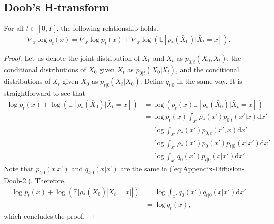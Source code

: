 

\subsection{Doob's H-transform}
\begin{lem}\label{lem:H-transform}
    For all $t\in [0,T]$, the following relationship holds.
    \begin{align}
    \nabla_x \log q_{t}(x) = \nabla_x \log p_{t}(x) + \nabla_x \log (\mathbb{E}[\rho_*(\bar{X}_0)|\bar{X}_{t}=x]).
    \label{eq:Appendix-Diffusion-Doob-1}
    \end{align}
\end{lem}
\begin{proof}
    Let us denote the joint distribution of $\bar{X}_0$ and $\bar{X}_t$ as $p_{0,t}(\bar{X}_0,\bar{X}_t)$, the conditional distributions of $\bar{X}_0$ given $\bar{X}_t$ as $p_{0|t}(\bar{X}_0|\bar{X}_t)$, and the conditional distributions of $\bar{X}_t$ given $\bar{X}_0$ as $p_{t|0}(\bar{X}_t|\bar{X}_0)$. Define $q_{t|0}$ in the same way. 
    It is straightforward to see that %
    \begin{align}
        \log p_{t}(x) + \log (\mathbb{E}[\rho_*(\bar{X}_0)|\bar{X}_{t}=x])
        &= \log (p_{t}(x)\mathbb{E}[\rho_*(\bar{X}_0)|\bar{X}_{t}=x])
        \\ & = \log p_{t}(x)\int_{x'} \rho_*(x')p_{0|t}(x'|x)\mathrm{d}x'
        \\ & = \log \int_{x'} \rho_*(x')p_{0,t}(x',x)\mathrm{d}x'
        \\ & = \log \int_{x'} \rho_*(x')p_0(x')p_{t|0}(x|x')\mathrm{d}x'
        \\ & = \log \int_{x'} q_0(x')p_{t|0}(x|x')\mathrm{d}x'.
        \label{eq:Appendix-Diffusion-Doob-2}
    \end{align}
    Note that $p_{t|0}(x|x')$ and $q_{t|0}(x|x')$ are the same in (\ref{eq:Appendix-Diffusion-Doob-2}). Therefore,
    \begin{align}
        \log p_{t}(x) + \log (\mathbb{E}[\rho_*(\bar{X}_0)|\bar{X}_{t}=x]|)
       & = \log \int_{x'} q_0(x')q_{t|0}(x|x')\mathrm{d}x'
        \\ & = \log q_t(x), 
    \end{align}
    which concludes the proof.
\end{proof}

